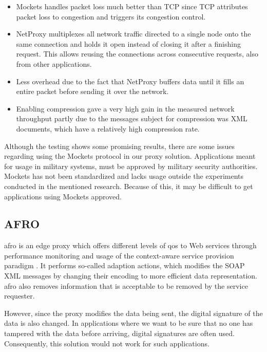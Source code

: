 \begin{itemize}

    \item Mockets handles packet loss much better than TCP since TCP attributes
    packet loss to congestion and triggers its congestion control.

    \item NetProxy multiplexes all network traffic directed to a single node
    onto the same connection and holds it open instead of closing it after a
    finishing request. This allows reusing the connections across consecutive
    requests, also from other applications.

    \item Less overhead due to the fact that NetProxy buffers data until it fills an
    entire packet before sending it over the network.

    \item Enabling compression gave a very high gain in the measured network
    throughput partly due to the messages subject for compression was XML
    documents, which have a relatively high compression rate.

\end{itemize}

Although the testing shows some promising results, there are some issues
regarding using the Mockets protocol in our proxy solution. Applications meant
for usage in military systems, must be approved by military security
authorities. Mockets has not been standardized and lacks usage outside the
experiments conducted in the mentioned research. Because of this, it may be
difficult to get applications using Mockets approved.

\subsection{AFRO}

\gls{afro} is an edge proxy which offers different levels of \gls{qos} to Web
services through performance monitoring and usage of the context-aware service
provision paradigm \cite{ist-090}. It performs so-called adaption actions, which
modifies the SOAP XML messages by changing their encoding to more efficient data
representation. \gls{afro} also removes information that is acceptable to be
removed by the service requester.

However, since the proxy modifies the data being sent, the digital signature of
the data is also changed. In applications where we want to be sure that no one
has tampered with the data before arriving, digital signatures are often used.
Consequently, this solution would not work for such applications.



